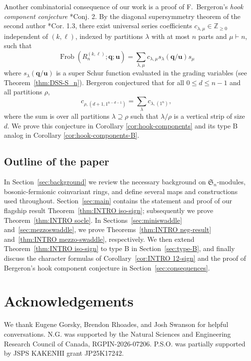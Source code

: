 \documentclass[11pt, reqno]{amsart}
\theoremstyle{definition}
\theoremstyle{remark}
\numberwithin{equation}{section}
\newcommand{\0}{\emptyset}
\newcommand{\Z}{\mathbb{Z}}
\renewcommand{\S}{\mathfrak{S}}
\DeclareMathOperator{\Frob}{Frob}
\begin{document}
Another combinatorial consequence of our work is a proof of 
F.~Bergeron's \emph{hook component conjecture} \cite{BergeronOPAC}*{Conj. 2}. 
By the diagonal supersymmetry theorem of the second 
author {\cite{Lentfer-Supersymmetry}*{Cor. 1.3}}, 
there exist universal series coefficients $c_{\lambda,\mu} \in \Z_{\geq0}$ 
independent of $(k,\ell)$, indexed by partitions $\lambda$ with 
at most $n$ parts and $\mu \vdash n$, such that 
\[
    \Frob(R_n^{(k,\ell)}; \mathbf{q}; \mathbf{u}) = \sum_{\lambda,\mu} c_{\lambda,\mu} s_\lambda(\mathbf{q}/\mathbf{u}) s_\mu
\]
where $s_\lambda(\mathbf{q}/\mathbf{u})$ is a super Schur function evaluated in the grading variables (see Theorem~\ref{thm:DSS-S_n}).
Bergeron conjectured that for all $0\leq d\leq n-1$ and all partitions $\rho$,
\[ c_{\rho,(d+1,1^{n-d-1})} = \sum_{\lambda} c_{\lambda,(1^n)}, \]
where the sum is over all partitions $\lambda\supseteq\rho$ 
such that $\lambda/\rho$ is a vertical strip of size $d$.
We prove this conjecture in Corollary \ref{cor:hook-components} 
and its type B analog in Corollary \ref{cor:hook-components-B}. 

\subsection{Outline of the paper} 
In Section~\ref{sec:background} we review the necessary background 
on $\S_n$-modules, bosonic-fermionic coinvariant rings, 
and define several maps and constructions used throughout. 
Section~\ref{sec:main} contains the statement and proof of 
our flagship result Theorem~\ref{thm:INTRO iso-sign}; subsequently we prove 
Theorem~\ref{thm:INTRO socle}. In Sections~\ref{sec:miniswaddle} 
and~\ref{sec:mezzoswaddle}, we prove Theorems~\ref{thm:INTRO neg-result} 
and~\ref{thm:INTRO mezzo-swaddle}, respectively. We then extend 
Theorem~\ref{thm:INTRO iso-sign} to type B in Section~\ref{sec:type-B}, 
and finally discuss the character formulas of Corollary~\ref{cor:INTRO 12-sign} 
and the proof of Bergeron's hook component conjecture in Section~\ref{sec:consequences}.

\section*{Acknowledgements}

We thank Eugene Gorsky, Brendon Rhoades, and Josh Swanson for helpful conversations. 
N.G. was supported by the Natural Sciences and 
Engineering Research Council of Canada, RGPIN-2026-07206. 
P.S.O. was partially supported by JSPS KAKENHI grant JP25K17242. 
\end{document}
